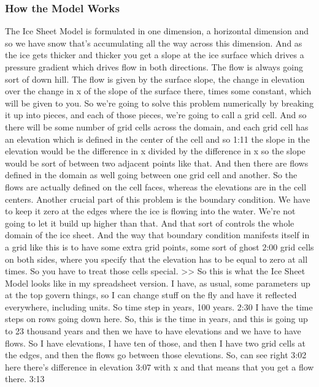 {\subsubsection{How the Model Works}\index{}
The Ice Sheet Model is formulated in one dimension, a horizontal dimension and so we have snow that's accumulating all the way across this dimension. And as the ice gets thicker and thicker you get a slope at the ice surface which drives a pressure gradient which drives flow in both directions. The flow is always going sort of down hill. The flow is given by the surface slope, the change in elevation over the change in x of the slope of the surface there, times some constant, which will be given to you. So we're going to solve this problem numerically by breaking it up into pieces, and each of those pieces, we're going to call a grid cell. And so there will be some number of grid cells across the domain, and each grid cell has an elevation which is defined in the center of the cell and so 
1:11
the slope in the elevation would be the difference in x divided by the difference in x so the slope would be sort of between two adjacent points like that. And then there are flows defined in the domain as well going between one grid cell and another. So the flows are actually defined on the cell faces, whereas the elevations are in the cell centers. Another crucial part of this problem is the boundary condition. We have to keep it zero at the edges where the ice is flowing into the water. We're not going to let it build up higher than that. And that sort of controls the whole domain of the ice sheet. And the way that boundary condition manifests itself in a grid like this is to have some extra grid points, some sort of ghost 
2:00
grid cells on both sides, where you specify that the elevation has to be equal to zero at all times. So you have to treat those cells special. >> So this is what the Ice Sheet Model looks like in my spreadsheet version. I have, as usual, some parameters up at the top govern things, so I can change stuff on the fly and have it reflected everywhere, including units. So time step in years, 100 years. 
2:30
I have the time steps on rows going down here. So, this is the time in years, and this is going up to 23 thousand years and then we have to have elevations and we have to have flows. So I have elevations, I have ten of those, and then I have two grid cells at the edges, and then the flows go between those elevations. So, can see right 
3:02
here there's difference in elevation 
3:07
with x and that means that you get a flow there. 
3:13
}
